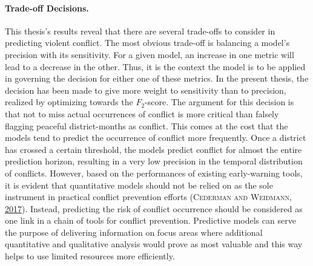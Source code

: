 \documentclass[a4paper,11pt]{article}
\begin{document}
\setcounter{page}{73}

\hypertarget{trade-off-decisions.}{%
\paragraph{Trade-off Decisions.}\label{trade-off-decisions.}}

This thesis's results reveal that there are several trade-offs to consider in
predicting violent conflict. The most obvious trade-off is balancing a model's
precision with its sensitivity. For a given model, an increase in one metric will
lead to a decrease in the other. Thus, it is the context the model is to be
applied in governing the decision for either one of these metrics. In the present
thesis, the decision has been made to give more weight to sensitivity than to
precision, realized by optimizing towards the \(F_2\)-score. The argument for this
decision is that not to miss actual occurrences of conflict is more critical than
falsely flagging peaceful district-months as conflict. This comes at the cost that
the models tend to predict the occurrence of conflict more frequently. Once a
district has crossed a certain threshold, the models predict conflict for almost
the entire prediction horizon, resulting in a very low precision in the temporal
distribution of conflicts. However, based on the performances of existing
early-warning tools, it is evident that quantitative models should not be relied
on as the sole instrument in practical conflict prevention efforts \textsc{(\textnormal{\textsc{Cederman} and \textsc{Weidmann}}, \textnormal{\protect\hyperlink{ref-cederman2017}{2017}})}.
Instead, predicting the risk of conflict occurrence should be considered as one
link in a chain of tools for conflict prevention. Predictive models can serve the
purpose of delivering information on focus areas where additional quantitative
and qualitative analysis would prove as most valuable and this way helps to use
limited resources more efficiently.
\end{document}
